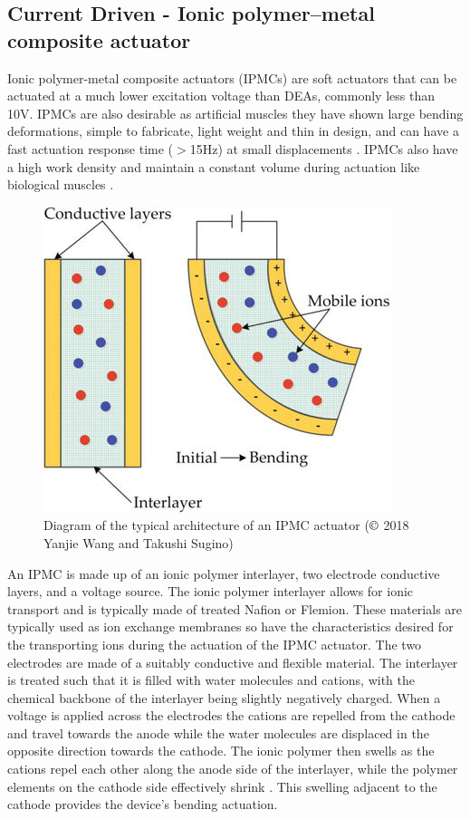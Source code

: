 \subsection{Current Driven - Ionic polymer–metal composite actuator}
Ionic polymer-metal composite actuators (IPMCs) are soft actuators that can be actuated at a much lower excitation voltage than DEAs, commonly less than 10V. IPMCs are also desirable as artificial muscles they have shown large bending deformations, simple to fabricate, light weight and thin in design, and can have a fast actuation response time ($>$15Hz) at small displacements \citep{Ma2020}. IPMCs also have a high work density and maintain a constant volume during actuation like biological muscles \cite{Neuhaus2020}.
\begin{figure}[H]
  \centering
  \includegraphics[width=0.5\linewidth]{Figures/IPMC.png}
  \caption{Diagram of the typical architecture of an IPMC actuator \citep{Yanjie2018} ($\copyright$ 2018 Yanjie Wang and Takushi Sugino)}
  \label{fig:Artificial Muscle_IPMC}
\end{figure}
An IPMC is made up of an ionic polymer interlayer, two electrode conductive layers, and a voltage source. The ionic polymer interlayer allows for ionic transport and is typically made of treated Nafion or Flemion. These materials are typically used as ion exchange membranes so have the characteristics desired for the transporting ions during the actuation of the IPMC actuator. The two electrodes are made of a suitably conductive and flexible material. The interlayer is treated such that it is filled with water molecules and cations, with the chemical backbone of the interlayer being slightly negatively charged. When a voltage is applied across the electrodes the cations are repelled from the cathode and travel towards the anode while the water molecules are displaced in the opposite direction towards the cathode. The ionic polymer then swells as the cations repel each other along the anode side of the interlayer, while the polymer elements on the cathode side effectively shrink \citep{Segalman1999}. This swelling adjacent to the cathode provides the device's bending actuation.

